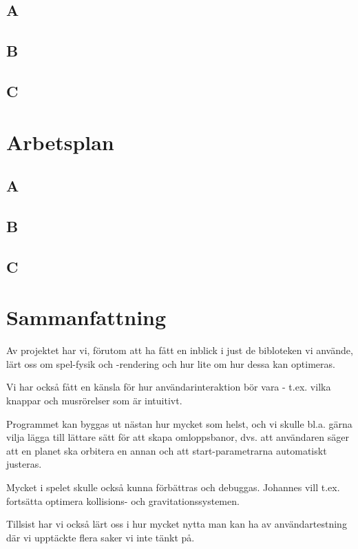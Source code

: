 \documentclass[a4paper, 11pt]{article}
\begin{document}
\subsection{A}


\subsection{B}


\subsection{C}


\section{Arbetsplan}
\label{sec:arbplan}

\subsection{A}


\subsection{B}


\subsection{C}


\section{Sammanfattning}

Av projektet har vi, förutom att ha fått en inblick i just de
bibloteken vi använde, lärt oss om spel-fysik och -rendering
och hur lite om hur dessa kan optimeras.

Vi har också fått en känsla för hur användarinteraktion bör
vara - t.ex. vilka knappar och musrörelser som är intuitivt.

Programmet kan byggas ut nästan hur mycket som helst,
och vi skulle bl.a. gärna vilja lägga till lättare sätt
för att skapa omloppsbanor, dvs. att användaren säger att
en planet ska orbitera en annan och att start-parametrarna
automatiskt justeras.

Mycket i spelet skulle också kunna förbättras och debuggas.
Johannes vill t.ex. fortsätta optimera kollisions- och gravitationssystemen.

Tillsist har vi också lärt oss i hur mycket nytta man
kan ha av användartestning där vi upptäckte flera saker vi inte tänkt på.
\end{document}
